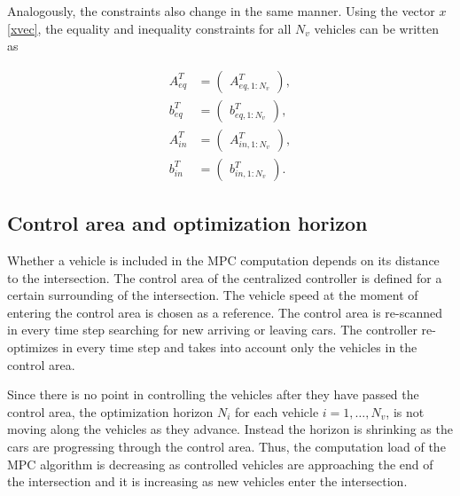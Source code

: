\documentclass[letterpaper,10pt,conference]{ieeeconf}
\begin{document}
Analogously, the constraints also change in the same manner. Using the vector $x$ \eqref{xvec}, the equality and inequality constraints for all $N_v$ vehicles can be written as

\begin{align}
A_{eq}^T&=
\begin{pmatrix}
    A_{eq,1:N_v}^T
    \end{pmatrix},\\
    b_{eq}^T&=\begin{pmatrix}
    b_{eq,1:N_v}^T
    \end{pmatrix}, \\
A_{in}^T&=
\begin{pmatrix}
    A_{in,1:N_v}^T
    \end{pmatrix},\\
    b_{in}^T&=\begin{pmatrix}
    b_{in,1:N_v}^T
    \end{pmatrix}.
\end{align}
\subsection{Control area and optimization horizon}
Whether a vehicle is included in the MPC computation depends on its distance to the intersection. The control area of the centralized controller is defined for a certain surrounding of the intersection. The vehicle speed at the moment of entering the control area is chosen as a reference. The control area is re-scanned in every time step searching for new arriving or leaving cars. The controller re-optimizes in every time step and takes into account only the vehicles in the control area. %

Since there is no point in controlling the vehicles after they have passed the control area, the optimization horizon $N_i$ for each vehicle $i = 1,\ldots,N_v$, is not moving along the vehicles as they advance. Instead the horizon is shrinking as the cars are progressing through the control area. Thus, the computation load of the MPC algorithm is decreasing as controlled vehicles are approaching the end of the intersection and it is increasing as new vehicles enter the intersection.
\end{document}
